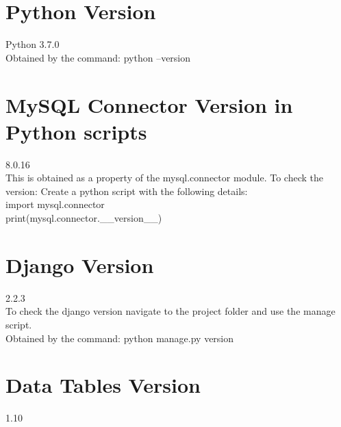 \documentclass[msc,deptreport,ai]{infthesis}      %
\begin{document}
 \section{Python Version}
 Python 3.7.0\\
 Obtained by the command: python --version
 \section{MySQL Connector Version in Python scripts}
 8.0.16\\
 This is obtained as a property of the mysql.connector module.
 To check the version:
 Create a python script with the following details:\\
 import mysql.connector\\
 print(mysql.connector.\_\_version\_\_)\\
 \section{Django Version}
 2.2.3\\
 To check the django version navigate to the project folder and use the manage script.\\
  Obtained by the command: python manage.py version
 \section{Data Tables Version}
 1.10
 
\end{document}
